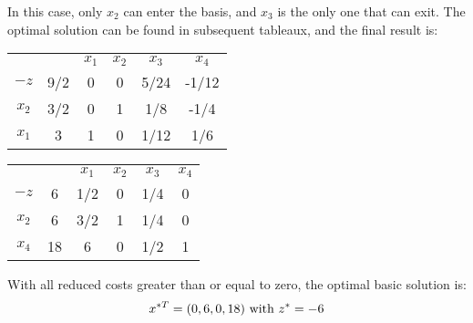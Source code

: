 \begin{example}
\begin{table}[H]
    \end{table}
    In this case, only $x_2$ can enter the basis, and $x_3$ is the only one that can exit.
    The optimal solution can be found in subsequent tableaux, and the final result is:
    \begin{table}[H]
        \centering
        \begin{tabular}{cccccc}
                                   &                            & $x_1$ & $x_2$ & $x_3$ & $x_4$                         \\ \cline{2-6} 
        \multicolumn{1}{c|}{$-z$}  & \multicolumn{1}{c|}{9/2}   & 0     & 0     & 5/24  & \multicolumn{1}{c|}{-1/12}    \\ \cline{2-6} 
        \multicolumn{1}{c|}{$x_2$} & \multicolumn{1}{c|}{3/2}   & 0     & 1     & 1/8   & \multicolumn{1}{c|}{-1/4}     \\
        \multicolumn{1}{c|}{$x_1$} & \multicolumn{1}{c|}{3}     & 1     & 0     & 1/12  & \multicolumn{1}{c|}{1/6}      \\ \cline{2-6} 
        \end{tabular}
    \end{table}
    \begin{table}[H]
        \centering
        \begin{tabular}{cccccc}
                                   &                         & $x_1$ & $x_2$ & $x_3$ & $x_4$                    \\ \cline{2-6} 
        \multicolumn{1}{c|}{$-z$}  & \multicolumn{1}{c|}{6}  & 1/2   & 0     & 1/4   & \multicolumn{1}{c|}{0}   \\ \cline{2-6} 
        \multicolumn{1}{c|}{$x_2$} & \multicolumn{1}{c|}{6}  & 3/2   & 1     & 1/4   & \multicolumn{1}{c|}{0}   \\
        \multicolumn{1}{c|}{$x_4$} & \multicolumn{1}{c|}{18} & 6     & 0     & 1/2   & \multicolumn{1}{c|}{1}   \\ \cline{2-6} 
        \end{tabular}
    \end{table}
    With all reduced costs greater than or equal to zero, the optimal basic solution is: 
    \[x^{*T}=(0,6,0,18) \textnormal{ with } z^{*}=-6\]
\end{example}

